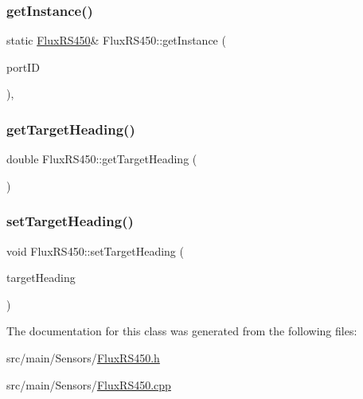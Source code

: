 \subsubsection{\texorpdfstring{get\+Instance()}{getInstance()}}
{\footnotesize\ttfamily static \hyperlink{classFluxRS450}{Flux\+R\+S450}\& Flux\+R\+S450\+::get\+Instance (\begin{DoxyParamCaption}\item[{S\+P\+I\+::\+Port}]{port\+ID }\end{DoxyParamCaption})\hspace{0.3cm}{\ttfamily [inline]}, {\ttfamily [static]}}

\mbox{\label{classFluxRS450_ab2642e1b6a64a18b522636de116bca2c}} 
\subsubsection{\texorpdfstring{get\+Target\+Heading()}{getTargetHeading()}}
{\footnotesize\ttfamily double Flux\+R\+S450\+::get\+Target\+Heading (\begin{DoxyParamCaption}{ }\end{DoxyParamCaption})}

\mbox{\label{classFluxRS450_af3c3eaca528a716ab97106fe62936e39}} 
\subsubsection{\texorpdfstring{set\+Target\+Heading()}{setTargetHeading()}}
{\footnotesize\ttfamily void Flux\+R\+S450\+::set\+Target\+Heading (\begin{DoxyParamCaption}\item[{double \&}]{target\+Heading }\end{DoxyParamCaption})}



The documentation for this class was generated from the following files\+:\begin{DoxyCompactItemize}
\item 
src/main/\+Sensors/\hyperlink{FluxRS450_8h}{Flux\+R\+S450.\+h}\item 
src/main/\+Sensors/\hyperlink{FluxRS450_8cpp}{Flux\+R\+S450.\+cpp}\end{DoxyCompactItemize}
